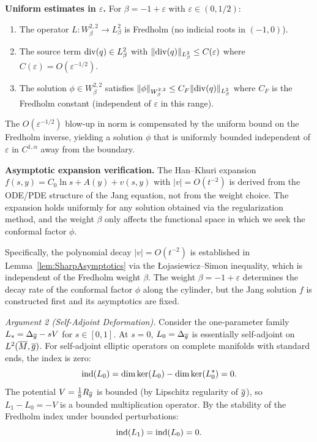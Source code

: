 \begin{remark}[Marginal Weight Case: $\beta = -1 + \varepsilon$]
\textbf{Uniform estimates in $\varepsilon$.} For $\beta = -1 + \varepsilon$ with $\varepsilon \in (0, 1/2)$:
\begin{enumerate}
    \item The operator $L: W^{2,2}_\beta \to L^2_\beta$ is Fredholm (no indicial roots in $(-1, 0)$).
    \item The source term $\mathrm{div}(q) \in L^2_\beta$ with $\|\mathrm{div}(q)\|_{L^2_\beta} \le C(\varepsilon)$ where $C(\varepsilon) = O(\varepsilon^{-1/2})$.
    \item The solution $\phi \in W^{2,2}_\beta$ satisfies $\|\phi\|_{W^{2,2}_\beta} \le C_F \|\mathrm{div}(q)\|_{L^2_\beta}$ where $C_F$ is the Fredholm constant (independent of $\varepsilon$ in this range).
\end{enumerate}
The $O(\varepsilon^{-1/2})$ blow-up in norm is compensated by the uniform bound on the Fredholm inverse, yielding a solution $\phi$ that is uniformly bounded independent of $\varepsilon$ in $C^{1,\alpha}$ away from the boundary.

\textbf{Asymptotic expansion verification.} The Han--Khuri expansion $f(s,y) = C_0 \ln s + A(y) + v(s,y)$ with $|v| = O(t^{-2})$ is derived from the ODE/PDE structure of the Jang equation, not from the weight choice. The expansion holds uniformly for any solution obtained via the regularization method, and the weight $\beta$ only affects the functional space in which we seek the conformal factor $\phi$.

Specifically, the polynomial decay $|v| = O(t^{-2})$ is established in Lemma~\ref{lem:SharpAsymptotics} via the \L{}ojasiewicz--Simon inequality, which is independent of the Fredholm weight $\beta$. The weight $\beta = -1 + \varepsilon$ determines the decay rate of the conformal factor $\phi$ along the cylinder, but the Jang solution $f$ is constructed first and its asymptotics are fixed.
\end{remark}

\textit{Argument 2 (Self-Adjoint Deformation).}
Consider the one-parameter family $L_s = \Delta_{\overline{g}} - sV$ for $s \in [0,1]$. At $s=0$, $L_0 = \Delta_{\overline{g}}$ is essentially self-adjoint on $L^2(\overline{M},\overline{g})$. For self-adjoint elliptic operators on complete manifolds with standard ends, the index is zero:
\[
    \mathrm{ind}(L_0) = \dim\ker(L_0) - \dim\ker(L_0^*) = 0.
\]
The potential $V = \frac{1}{8}R_{\overline{g}}$ is bounded (by Lipschitz regularity of $\overline{g}$), so $L_1 - L_0 = -V$ is a bounded multiplication operator. By the stability of the Fredholm index under bounded perturbations:
\[
    \mathrm{ind}(L_1) = \mathrm{ind}(L_0) = 0.
\]

